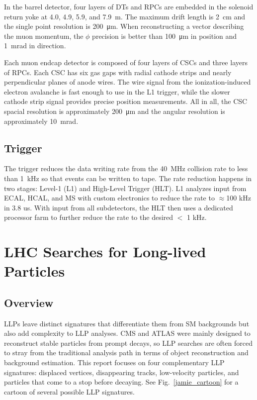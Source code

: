 \documentclass[12pt]{article}
\begin{document}
        In the barrel detector, four layers of DTs and RPCs are embedded in the solenoid return yoke at \num{4.0}, \num{4.9}, \num{5.9}, and \SI{7.9}{m}. The maximum drift length is \SI{2}{\centi\m} and the single point resolution is \SI{200}{\micro\m}. When reconstructing a vector describing the muon momentum, the $\phi$ precision is better than \SI{100}{\micro\m} in position and \SI{1}{\milli\radian} in direction. 

        Each muon endcap detector is composed of four layers of CSCs and three layers of RPCs. Each CSC has six gas gaps with radial cathode strips and nearly perpendicular planes of anode wires. The wire signal from the ionization-induced electron avalanche is fast enough to use in the L1 trigger, while the slower cathode strip signal provides precise position measurements. All in all, the CSC spacial resolution is approximately \SI{200}{\micro\m} and the angular resolution is approximately \SI{10}{\milli\radian}.

    \subsection{Trigger}
        The trigger reduces the data writing rate from the \SI{40}{\mega\hertz} collision rate to less than \SI{1}{\kilo\hertz} so that events can be written to tape. The rate reduction happens in two stages: Level-1 (L1) and High-Level Trigger (HLT). L1 analyzes input from ECAL, HCAL, and MS with custom electronics to reduce the rate to $\approx$100 kHz in 3.8 us. With input from all subdetectors, the HLT then uses a dedicated processor farm to further reduce the rate to the desired $<$ 1 kHz\cite{cms_experiment, cms_trigger_upgrade}.

        

\section{LHC Searches for Long-lived Particles} \label {analyses}
    \subsection{Overview}
        LLPs leave distinct signatures that differentiate them from SM backgrounds but also add complexity to LLP analyses. CMS and ATLAS were mainly designed to reconstruct stable particles from prompt decays, so LLP searches are often forced to stray from the traditional analysis path in terms of object reconstruction and background estimation. This report focuses on four complementary LLP signatures: displaced vertices, disappearing tracks, low-velocity particles, and particles that come to a stop before decaying. See Fig.~\ref{jamie_cartoon} for a cartoon of several possible LLP signatures.
\end{document}
